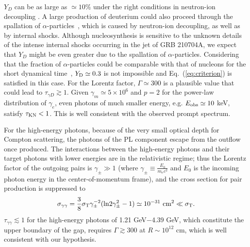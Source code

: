 \documentclass[prd,twocolumn,amsmath,amssymb,aps,linenumbers]{revtex4-2} %
\begin{document}
$Y_{D}$ can be as large as $\simeq10\%$ under the right conditions in neutron-ion decoupling \citep[see the simulation in][]{2002ApJ...580..368P}. A large production of deuterium could also proceed through the spallation
of $\alpha$-particles~\citep{2003ApJ...588..931B}, which is caused by neutron-ion decoupling, as well as by internal shocks.
Although nucleosynthesis is sensitive to the unknown details of the intense internal shocks occurring in the jet of GRB 210704A, we expect that $Y_{D}$ might be even greater due to the spallation of $\alpha$-particles. Considering that the fraction of $\alpha$-particles could be comparable with that of nucleons for the short dynamical time~\citep[]{2002ApJ...580..368P,2003ApJ...588..931B}, $Y_{\rm D}\simeq0.3$ is not impossible and Eq.~(\ref{eq:criterion}) is satisfied in this case. For the Lorentz factor, $\Gamma\simeq 300$ is a plausible value that could lead to $\tau_{\gamma D}\gtrsim1$.
Given $\gamma_m\simeq5\times10^{6}$ and $p=2$ for the power-law distribution of $\gamma_e$, even photons of much smaller energy, e.g. $E_{\rm obs}\simeq10$ keV, satisfy $\tau_{\rm KN}<1$. This is well consistent with the observed prompt spectrum.

 For the high-energy photons, because of the very small optical depth for Compton scattering, the photons of the PL component escape from the outflow once produced. The interactions between the high-energy photons and their target photons with lower energies are in the relativistic regime; thus the Lorentz factor of the outgoing pairs is $\gamma_{\pm}\gg1$ (where $\gamma_{\pm}\equiv\frac{E_{0}}{m_e c^2}$ and $E_{0}$ is the incoming photon
energy in the center-of-momentum frame), and the cross section for pair production is suppressed to~\citep{1976tper.book.....J, 2018pgrb.book.....Z}
\begin{equation}
\sigma_{\gamma\gamma}=\frac{3}{8}\sigma_{\rm T} \gamma_{\pm}^{-2}({\rm ln}2\gamma_{\pm}^2 -1)\simeq10^{-31} \ {\rm cm}^{2}\ll \sigma_{\rm T}.
\end{equation}
$\tau_{\gamma\gamma}\lesssim1$ for the high-energy photons of 1.21 GeV$-$4.39 GeV, which constitute the upper boundary of the gap, requires $\Gamma\gtrsim300$ at $R\sim10^{12}$ cm, which is well consistent with our hypothesis.






\end{document}
